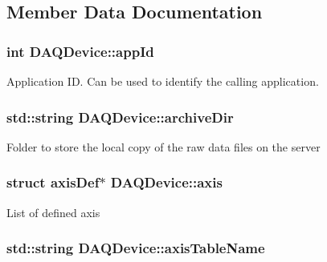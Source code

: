 \subsection{Member Data Documentation}
\hypertarget{classDAQDevice_a2f0b3d2e531be7f5d06f47a4753d35bd}{
\subsubsection[{app\-Id}]{\setlength{\rightskip}{0pt plus 5cm}int D\-A\-Q\-Device\-::app\-Id\hspace{0.3cm}{\ttfamily [protected]}}}\label{classDAQDevice_a2f0b3d2e531be7f5d06f47a4753d35bd}
Application I\-D. Can be used to identify the calling application. \hypertarget{classDAQDevice_a40eb0f06fac7ec90ed04b766b1f5df3c}{
\subsubsection[{archive\-Dir}]{\setlength{\rightskip}{0pt plus 5cm}std\-::string D\-A\-Q\-Device\-::archive\-Dir\hspace{0.3cm}{\ttfamily [protected]}}}\label{classDAQDevice_a40eb0f06fac7ec90ed04b766b1f5df3c}
Folder to store the local copy of the raw data files on the server \hypertarget{classDAQDevice_ad4d9fa4d5ec7b391260d89393ed13a37}{
\subsubsection[{axis}]{\setlength{\rightskip}{0pt plus 5cm}struct {\bf axis\-Def}$\ast$ D\-A\-Q\-Device\-::axis\hspace{0.3cm}{\ttfamily [protected]}}}\label{classDAQDevice_ad4d9fa4d5ec7b391260d89393ed13a37}
List of defined axis \hypertarget{classDAQDevice_af33c38b4bf6c138dc60d84a9bfb6df85}{
\subsubsection[{axis\-Table\-Name}]{\setlength{\rightskip}{0pt plus 5cm}std\-::string D\-A\-Q\-Device\-::axis\-Table\-Name\hspace{0.3cm}{\ttfamily [protected]}}}\label{classDAQDevice_af33c38b4bf6c138dc60d84a9bfb6df85}
